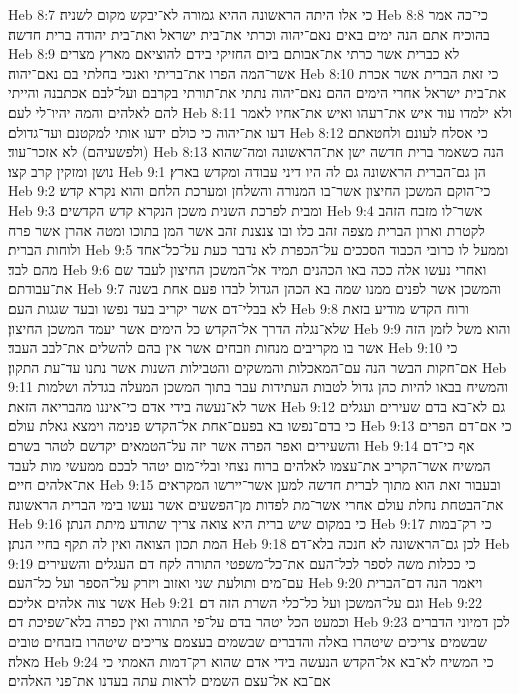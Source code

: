 Heb 8:7  כי אלו היתה הראשונה ההיא גמורה לא־יבקש מקום לשניה׃
Heb 8:8  כי־כה אמר בהוכיח אתם הנה ימים באים נאם־יהוה וכרתי את־בית ישראל ואת־בית יהודה ברית חדשה׃
Heb 8:9  לא כברית אשר כרתי את־אבותם ביום החזיקי בידם להוציאם מארץ מצרים אשר־המה הפרו את־בריתי ואנכי בחלתי בם נאם־יהוה׃
Heb 8:10  כי זאת הברית אשר אכרת את־בית ישראל אחרי הימים ההם נאם־יהוה נתתי את־תורתי בקרבם ועל־לבם אכתבנה והייתי להם לאלהים והמה יהיו־לי לעם׃
Heb 8:11  ולא ילמדו עוד איש את־רעהו ואיש את־אחיו לאמר דעו את־יהוה כי כולם ידעו אותי למקטנם ועד־גדולם׃
Heb 8:12  כי אסלח לעונם ולחטאתם (ולפשעיהם) לא אזכר־עוד׃
Heb 8:13  הנה כשאמר ברית חדשה ישן את־הראשונה ומה־שהוא נושן ומזקין קרב קצו׃
Heb 9:1  הן גם־הברית הראשונה גם לה היו דיני עבודה ומקדש בארץ׃
Heb 9:2  כי־הוקם המשכן החיצון אשר־בו המנורה והשלחן ומערכת הלחם והוא נקרא קדש׃
Heb 9:3  ומבית לפרכת השנית משכן הנקרא קדש הקדשים׃
Heb 9:4  אשר־לו מזבח הזהב לקטרת וארון הברית מצפה זהב כלו ובו צנצנת זהב אשר המן בתוכו ומטה אהרן אשר פרח ולוחות הברית׃
Heb 9:5  וממעל לו כרובי הכבוד הסככים על־הכפרת לא נדבר כעת על־כל־אחד מהם לבד׃
Heb 9:6  ואחרי נעשו אלה ככה באו הכהנים תמיד אל־המשכן החיצון לעבד שם את־עבודתם׃
Heb 9:7  והמשכן אשר לפנים ממנו שמה בא הכהן הגדול לבדו פעם אחת בשנה לא בבלי־דם אשר יקריב בעד נפשו ובעד שגגות העם׃
Heb 9:8  ורוח הקדש מודיע בזאת שלא־נגלה הדרך אל־הקדש כל הימים אשר יעמד המשכן החיצון׃
Heb 9:9  והוא משל לזמן הזה אשר בו מקריבים מנחות וזבחים אשר אין בהם להשלים את־לבב העבד׃
Heb 9:10  כי אם־חקות הבשר הנה עם־המאכלות והמשקים והטבילות השנות אשר נתנו עד־עת התקון׃
Heb 9:11  והמשיח בבאו להיות כהן גדול לטבות העתידות עבר בתוך המשכן המעלה בגדלה ושלמות אשר לא־נעשה בידי אדם כי־איננו מהבריאה הזאת׃
Heb 9:12  גם לא־בא בדם שעירים ועגלים כי בדם־נפשו בא בפעם־אחת אל־הקדש פנימה וימצא גאלת עולם׃
Heb 9:13  כי אם־דם הפרים והשעירים ואפר הפרה אשר יזה על־הטמאים יקדשם לטהר בשרם׃
Heb 9:14  אף כי־דם המשיח אשר־הקריב את־עצמו לאלהים ברוח נצחי ובלי־מום יטהר לבכם ממעשי מות לעבד את־אלהים חיים׃
Heb 9:15  ובעבור זאת הוא מתוך לברית חדשה למען אשר־יירשו המקראים את־הבטחת נחלת עולם אחרי אשר־מת לפדות מן־הפשעים אשר נעשו בימי הברית הראשונה׃
Heb 9:16  כי במקום שיש ברית היא צואה צריך שתודע מיתת הנתן׃
Heb 9:17  כי רק־במות המת תכון הצואה ואין לה תקף בחיי הנתן׃
Heb 9:18  לכן גם־הראשונה לא חנכה בלא־דם׃
Heb 9:19  כי ככלות משה לספר לכל־העם את־כל־משפטי התורה לקח דם העגלים והשעירים עם־מים ותולעת שני ואזוב ויזרק על־הספר ועל כל־העם׃
Heb 9:20  ויאמר הנה דם־הברית אשר צוה אלהים אליכם׃
Heb 9:21  וגם על־המשכן ועל כל־כלי השרת הזה דם׃
Heb 9:22  וכמעט הכל יטהר בדם על־פי התורה ואין כפרה בלא־שפיכת דם׃
Heb 9:23  לכן דמיוני הדברים שבשמים צריכים שיטהרו באלה והדברים שבשמים בעצמם צריכים שיטהרו בזבחים טובים מאלה׃
Heb 9:24  כי המשיח לא־בא אל־הקדש הנעשה בידי אדם שהוא רק־דמות האמתי כי אם־בא אל־עצם השמים לראות עתה בעדנו את־פני האלהים׃
